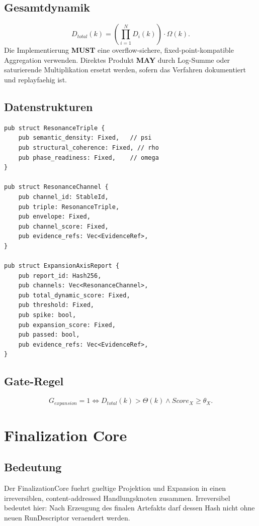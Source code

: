 \documentclass[11pt,a4paper]{article}
\newcommand{\MUST}{\textbf{MUST}}
\newcommand{\MAY}{\textbf{MAY}}
\begin{document}
\subsection{Gesamtdynamik}
\[
D_{total}(k)=\left(\prod_{i=1}^{N}D_i(k)\right)\cdot\Omega(k).
\]
Die Implementierung \MUST{} eine overflow-sichere, fixed-point-kompatible Aggregation verwenden. Direktes Produkt \MAY{} durch Log-Summe oder saturierende Multiplikation ersetzt werden, sofern das Verfahren dokumentiert und replayfaehig ist.

\subsection{Datenstrukturen}
\begin{lstlisting}
pub struct ResonanceTriple {
    pub semantic_density: Fixed,   // psi
    pub structural_coherence: Fixed, // rho
    pub phase_readiness: Fixed,    // omega
}

pub struct ResonanceChannel {
    pub channel_id: StableId,
    pub triple: ResonanceTriple,
    pub envelope: Fixed,
    pub channel_score: Fixed,
    pub evidence_refs: Vec<EvidenceRef>,
}

pub struct ExpansionAxisReport {
    pub report_id: Hash256,
    pub channels: Vec<ResonanceChannel>,
    pub total_dynamic_score: Fixed,
    pub threshold: Fixed,
    pub spike: bool,
    pub expansion_score: Fixed,
    pub passed: bool,
    pub evidence_refs: Vec<EvidenceRef>,
}
\end{lstlisting}

\subsection{Gate-Regel}
\[
G_{expansion}=1 \Longleftrightarrow D_{total}(k)>\Theta(k) \wedge Score_X\ge \theta_X.
\]

\section{Finalization Core}

\subsection{Bedeutung}
Der FinalizationCore fuehrt gueltige Projektion und Expansion in einen irreversiblen, content-addressed Handlungsknoten zusammen. Irreversibel bedeutet hier: Nach Erzeugung des finalen Artefakts darf dessen Hash nicht ohne neuen RunDescriptor veraendert werden.
\end{document}
